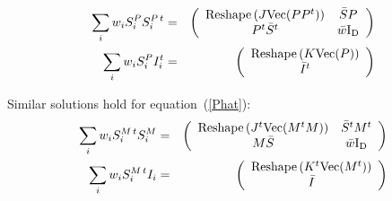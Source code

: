 \documentclass[12pt]{amsart}
\newcommand{\Id}{ {\rm I_D} }
\newcommand{\reshape}{ {\rm Reshape} }
\renewcommand{\vec}{ {\rm Vec} }
\begin{document}
\begin{eqnarray*}
\sum_i w_i S_i^P S_i^{P\,t}
& = &
          \left( \begin{array}{cc} 
          		\reshape\left(J \vec(PP^t)\right)  &  \bar{S}P \\
			P^t \bar{S}^t 			& \bar{w} \Id 
			\end{array}
          \right) \\
\sum_i w_i S_i^P I_i^t
& = & \left( \begin{array}{c} \reshape\left(K\vec(P)\right) \\ \bar{I}^t \end{array} \right)
\end{eqnarray*}

Similar solutions hold for equation~(\ref{Phat}):
\begin{eqnarray*}
\sum_i w_i S_i^{M\,t} S_i^M
& = &
          \left( \begin{array}{cc} 
          		\reshape\left(J^t \vec(M^tM)\right)  &  \bar{S}^t M^t  \\
			M\bar{S}					     & \bar{w} \Id 
			\end{array}
          \right) \\
\sum_i w_i S_i^{M\,t} I_i
& = & \left( \begin{array}{c} \reshape\left(K^t\vec(M^t)\right) \\ \bar{I} \end{array} \right)
\end{eqnarray*}
\end{document}
